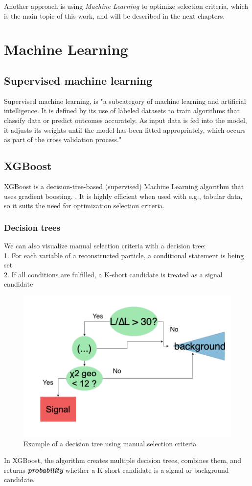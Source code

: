 \documentclass[12pt,a4paper]{report}
\begin{document}
Another approach is using \emph{Machine Learning} to optimize selection criteria, which is the main topic of this work, and will be described in the next chapters.


\chapter{Machine Learning}
\section{Supervised machine learning}
Supervised machine learning, is "a subcategory of machine learning and artificial intelligence. It is defined by its use of labeled datasets to train algorithms that classify data or predict outcomes accurately. As input data is fed into the model, it adjusts its weights until the model has been fitted appropriately, which occurs as part of the cross validation process."\cite{ibm}
\section{XGBoost}
XGBoost  is a decision-tree-based (supervised) Machine Learning algorithm that uses gradient boosting. \cite{xgboost}. It is highly efficient when used with e.g., tabular data, so it suits the need for optimization selection criteria.\cite{shahid}
\subsection{Decision trees}
We can also visualize manual selection criteria with a decision tree:\\
1. For each variable of a reconstructed particle, a conditional statement is being set \\
2. If all conditions are fulfilled, a K-short candidate is treated as a signal  candidate\\
\begin{figure}[H]
    \centering
    \includegraphics[width=.7\textwidth]{images/decision_tree.png}
    \caption{Example of a decision tree using manual selection criteria}
\end{figure}
In XGBoost, the algorithm creates multiple decision trees, combines them, and returns \textbf{\emph{probability}} whether a K-short candidate is a signal or background candidate.
\end{document}
